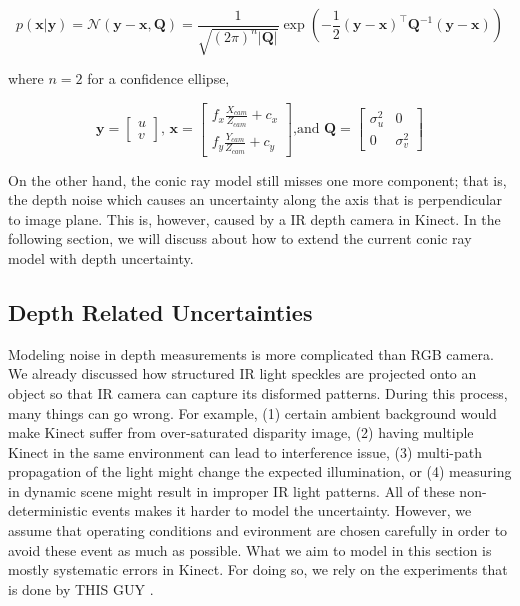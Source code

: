 \documentclass[a4paper]{report}
\numberwithin{figure}{section}
\begin{document}
\begin{equation}
  p(\mathbf{x}|\mathbf{y}) = \mathcal{N}(\mathbf{y}-\mathbf{x, \mathbf{Q}}) = 
  \frac{1}{\sqrt{(2\pi)^n|\mathbf{Q}|}} 
  \exp(-\frac{1}{2} (\mathbf{y}-\mathbf{x})^\intercal \mathbf{Q}^{-1} (\mathbf{y}-\mathbf{x}))
\end{equation} \label{eq:cov_ellipse}

where $n=2$ for a confidence ellipse,

\begin{equation}
  \mathbf{y} = \begin{bmatrix}u \\ v \end{bmatrix} \text{, } 
  \mathbf{x} = \begin{bmatrix} f_x \frac{X_{cam}}{Z_{cam}} + c_x \\ f_y \frac{Y_{cam}}{Z_{cam}} + c_y \end{bmatrix} \text{,and }
  \mathbf{Q} = \begin{bmatrix} \sigma_u^2 & 0 \\ 0 & \sigma_v^2 \end{bmatrix}
\end{equation}

On the other hand, the conic ray model still misses one more component; 
that is, the depth noise which causes an uncertainty 
along the axis that is perpendicular to image plane. 
This is, however, caused by a IR depth camera in Kinect. 
In the following section, we will discuss about how to extend the current conic ray 
model with depth uncertainty.

\subsection{Depth Related Uncertainties} \label{sb_sc_depth_uncertainty}

Modeling noise in depth measurements is more complicated than RGB camera. We 
already discussed how structured IR light speckles are projected onto an object 
so that IR camera can capture its disformed patterns. During this process, 
many things can go wrong. For example, (1) certain ambient background would make 
Kinect suffer from over-saturated disparity image, (2) having multiple Kinect 
in the same environment can lead to interference issue, (3) multi-path 
propagation of the light might change the expected illumination, or (4) measuring 
in dynamic scene might result in improper IR light patterns. All of these 
non-deterministic events makes it harder to model the uncertainty. However, 
we assume that operating conditions and evironment are chosen carefully 
in order to avoid these event as much as possible. What we aim to model in this 
section is mostly systematic errors in Kinect. For doing so, we rely on 
the experiments that is done by THIS GUY \cite{}. 
\end{document}
